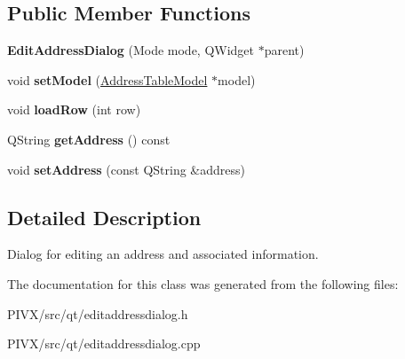 \subsection*{Public Member Functions}
\begin{DoxyCompactItemize}
\item 
\mbox{\label{class_edit_address_dialog_a625792e82d332070d6009898febc3afa}} 
{\bfseries Edit\+Address\+Dialog} (Mode mode, Q\+Widget $\ast$parent)
\item 
\mbox{\label{class_edit_address_dialog_a57d26af2c34bd45c06596e9b3fc9a446}} 
void {\bfseries set\+Model} (\mbox{\hyperlink{class_address_table_model}{Address\+Table\+Model}} $\ast$model)
\item 
\mbox{\label{class_edit_address_dialog_a45d90d6f757fb4b20788710c8533036b}} 
void {\bfseries load\+Row} (int row)
\item 
\mbox{\label{class_edit_address_dialog_afe0ba363f55641dc7e510fff7764a5f1}} 
Q\+String {\bfseries get\+Address} () const
\item 
\mbox{\label{class_edit_address_dialog_afcaca5a8e493b9493d2ca2430f7ac5eb}} 
void {\bfseries set\+Address} (const Q\+String \&address)
\end{DoxyCompactItemize}


\subsection{Detailed Description}
Dialog for editing an address and associated information. 

The documentation for this class was generated from the following files\+:\begin{DoxyCompactItemize}
\item 
P\+I\+V\+X/src/qt/editaddressdialog.\+h\item 
P\+I\+V\+X/src/qt/editaddressdialog.\+cpp\end{DoxyCompactItemize}
